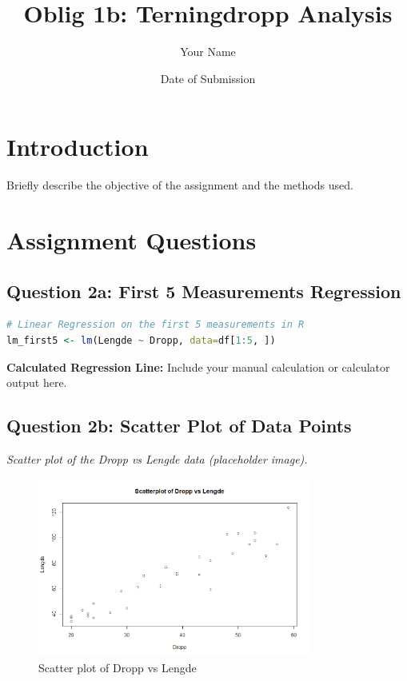 \documentclass{article}
\title{Oblig 1b: Terningdropp Analysis}
\author{Your Name}
\date{Date of Submission}
\begin{document}
\maketitle

\section{Introduction}
Briefly describe the objective of the assignment and the methods used.

\section{Assignment Questions}

\subsection{Question 2a: First 5 Measurements Regression}
\begin{lstlisting}[language=R]
# Linear Regression on the first 5 measurements in R
lm_first5 <- lm(Lengde ~ Dropp, data=df[1:5, ])
\end{lstlisting}
\textbf{Calculated Regression Line:} Include your manual calculation or calculator output here.

\subsection{Question 2b: Scatter Plot of Data Points}
\textit{Scatter plot of the Dropp vs Lengde data (placeholder image).}
\begin{figure}[h]
    \centering
    \includegraphics[width=0.8\textwidth]{Rplot03.png}
    \caption{Scatter plot of Dropp vs Lengde}
\end{figure}
\end{document}
